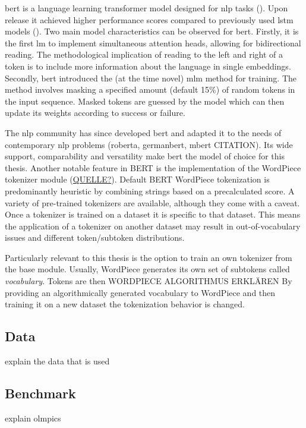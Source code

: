 \documentclass[english]{ttlab-qualify}
\begin{document}
    \ac{bert} is a language learning transformer model designed for \ac{nlp} tasks (\cite{ATTENTION}).
    Upon release it achieved higher performance scores compared to previously used \ac{lstm} models (\cite{BERTHIGH1}).
    Two main model characteristics can be observed for \ac{bert}.
    Firstly, it is the first \ac{lm} to implement simultaneous attention heads, allowing for bidirectional reading.
    The methodological implication of reading to the left and right of a token is to include more information about the language in single embeddings.
    Secondly, \ac{bert} introduced the (at the time novel) \ac{mlm} method for training.
    The method involves masking a specified amount (default 15\%) of random tokens in the input sequence.
    Masked tokens are guessed by the model which can then update its weights according to success or failure.

    The \ac{nlp} community has since developed \ac{bert} and adapted it to the needs of contemporary \ac{nlp} problems (roberta, germanbert, mbert \uppercase{citation}).
    Its wide support, comparability and versatility make \ac{bert} the model of choice for this thesis.
    Another notable feature in \uppercase{bert} is the implementation of the WordPiece tokenizer module (\uppercase{\href{https://huggingface.co/course/chapter6/6?fw=pt}{quelle?}}).
    Default BERT WordPiece tokenization is predominantly heuristic by combining strings based on a precalculated score.
    A variety of pre-trained tokenizers are available, although they come with a caveat.
    Once a tokenizer is trained on a dataset it is specific to that dataset.
    This means the application of a tokenizer on another dataset may result in out-of-vocabulary issues and different token/subtoken distributions.

    Particularly relevant to this thesis is the option to train an own tokenizer from the base module.
    Usually, WordPiece generates its own set of subtokens called \textit{vocabulary}.
    Tokens are then \uppercase{WORDPIECE algorithmus erklären}
    By providing an algorithmically generated vocabulary to WordPiece and then training it on a new dataset the tokenization behavior is changed.




    \subsection{Data}
    \label{subsec:data}
    explain the data that is used

    \subsection{Benchmark}
    \label{subsec:benchmark}
    explain olmpics
\end{document}
